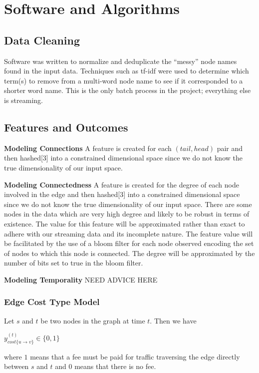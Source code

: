 \documentclass{article} %
\begin{document}
\section{Software and Algorithms}

\subsection{Data Cleaning}
Software was written to normalize and deduplicate the ``messy'' node names
found in the input data.  Techniques such as tf-idf were used to determine
which term(s) to remove from a multi-word node name to see if it
corresponded to a shorter word name.  This is the only batch process in the project; everything else is streaming.

\subsection{Features and Outcomes}

\textbf{Modeling Connections} A feature is created for each $(tail,head)$ pair and then hashed[3] into a
constrained dimensional space since we do not know the true dimensionality
of our input space.  

\textbf{Modeling Connectedness} A feature is created for the degree of each node
  involved in the edge  and then hashed[3] into a
constrained dimensional space since we do not know the true dimensionality
of our input space.  There are some nodes in
  the data which are very high degree and likely to be robust in terms of
  existence.  The value for this feature will be approximated rather than
  exact to adhere with our streaming data and its incomplete nature.  The feature value will be facilitated by the use of a
  bloom filter for each node observed encoding the set of nodes to which
  this node is connected.  The degree will be approximated by the
  number of bits set to true in the bloom filter.  

\textbf{Modeling Temporality} NEED ADVICE HERE

\subsubsection{Edge Cost Type Model}
Let $s$ and $t$ be two nodes in the graph at time $t$.  Then we have

$y_{cost\{u \rightarrow v\}}^{(t)} \in \{0,1\}$ 

where $1$ means that a fee must be paid for
traffic traversing the edge directly
between $s$ and $t$ and $0$ means that there is no fee.
\end{document}
